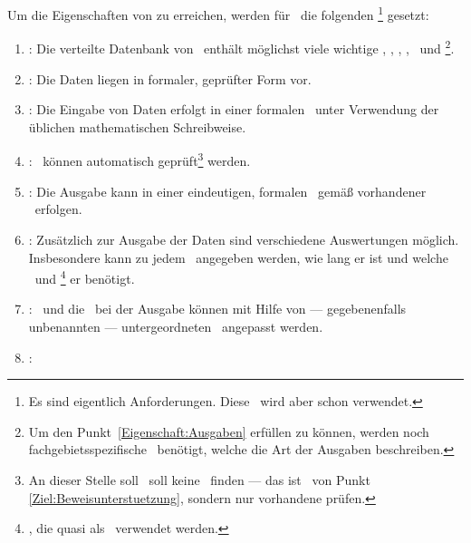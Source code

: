 \section[Ziele]{\Ziele}%
\beginsection  {\Ziele}
\label      {sec:Ziele}

Um die Eigenschaften von  zu erreichen, werden für \ASBA\ die folgenden \Ziele%
\footnote{%
	Es sind eigentlich Anforderungen.
	Diese \Bezeichnung\ wird aber schon  verwendet.
}
gesetzt:
\begin{enumerate}
	\item \label{Ziel:Daten} :
	Die verteilte Datenbank von \ASBA\ enthält möglichst viele wichtige \Axiome, \Saetze, \Beweise, \Fachbegriffe, \Fachgebiete\ und \Ausgabeschemata%
	\footnote{%
		Um den Punkt~\ref{Eigenschaft:Ausgaben}  erfüllen zu können, werden noch fachgebietsspezifische \Ausgabeschemata\ benötigt, welche die Art der Ausgaben beschreiben.
	}.
	\item \label{Ziel:Form} :
	Die Daten liegen in formaler, geprüfter Form vor.
	\item \label{Ziel:Eingaben} :
	Die Eingabe von Daten erfolgt in einer formalen \Syntax\ unter Verwendung der üblichen mathematischen Schreibweise.
	\item \label{Ziel:Pruefung} :
	\Beweise\ können automatisch geprüft\footnote{%
		An dieser Stelle soll \ASBA\ soll keine \Beweise\ finden --- das ist \Ziel\ von Punkt \ref{Ziel:Beweisunterstuetzung}, sondern nur vorhandene prüfen.
	}
	werden.
	\item \label{Ziel:Ausgaben} :
	Die Ausgabe kann in einer eindeutigen, formalen \Syntax\ gemäß vorhandener \Ausgabeschemata\ erfolgen.
	\item \label{Ziel:Auswertungen} :
	Zusätzlich zur Ausgabe der Daten sind verschiedene Auswertungen möglich.
	Insbesondere kann zu jedem \Beweis\ angegeben werden, wie lang er ist und welche \Axiome\ und \Saetze%
	\footnote{%
		\Saetze, die quasi als \Axiome\ verwendet werden.
	}
	er benötigt.
	\item \label{Ziel:Anpassbarkeit} :
	\Fachbegriffe\ und die \Darstellung\ bei der Ausgabe können mit Hilfe von --- gegebenenfalls unbenannten --- untergeordneten \Fachgebieten\ angepasst werden.
	\item \label{Ziel:Individualitaet} :

\end{enumerate}
